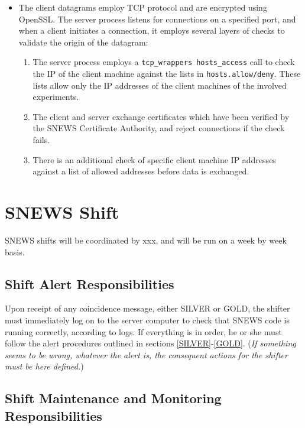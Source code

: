 \documentclass{article}
\begin{document}
\begin{itemize}
\item The client datagrams employ TCP protocol and 
are encrypted using OpenSSL.  
The server process listens for connections on a specified port,
and when a client initiates a connection, it employs several layers
of checks to validate the origin of the datagram:
\begin{enumerate}
\item The server process employs a {\tt tcp\_wrappers hosts\_access}
call to check the IP of the client machine against the lists in
{\tt hosts.allow/deny}.  These lists allow only the IP addresses
of the client machines of the involved experiments.
\item
The client and server exchange certificates which have been
verified by the SNEWS Certificate Authority, and reject
connections if the check fails.
\item There is an additional check of specific client machine
IP addresses against a list of allowed addresses before data is exchanged.
\end{enumerate}
\end{itemize}

\section{SNEWS Shift}

SNEWS shifts will be coordinated by xxx, and will be run on
a week by week basis.  


\subsection{Shift Alert Responsibilities}

Upon receipt of any coincidence message, either SILVER or GOLD, the
shifter must immediately log on to the server computer to check that
SNEWS code is running correctly, according to logs.  If everything
is in order, he or she must follow
the alert procedures outlined in sections \ref{SILVER}-\ref{GOLD}.  ({\it If
something seems to be wrong, whatever the alert is, the consequent
actions for the shifter must be here defined.})

\subsection{Shift Maintenance and Monitoring Responsibilities}
\end{document}
